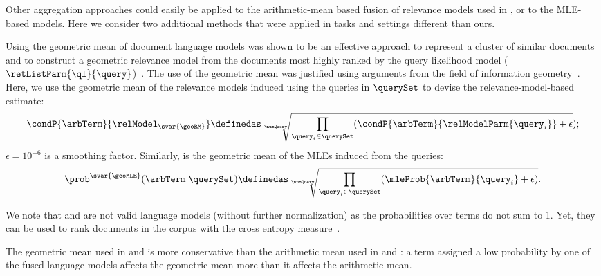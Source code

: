 Other aggregation approaches could easily be applied to the
arithmetic-mean based fusion of relevance models used in \method{\ariRM}, or
to the MLE-based models.
Here we consider two additional methods that were applied in tasks
and settings different than ours.

 Using the geometric mean of document
language models was shown to be an effective approach to represent a
cluster of similar documents~\cite{Liu+Croft:08a} and to
construct a geometric relevance model from the documents
most highly ranked by the query likelihood model
($\retListParm{\ql}{\query}$)~\cite{Seo+Croft:10a}.
The use of the geometric mean was justified using arguments from the
field of information geometry~\cite{Seo+Croft:10a}.
Here, we use the geometric mean of the relevance models induced using
the queries in $\querySet$ to devise the \firstmention{\geoRM}
relevance-model-based estimate:
\begin{equation}
\label{eq:geo}
\condP{\arbTerm}{\relModel_{\svar{\geoRM}}} \definedas \sqrt[\numQuery]{ \prod_{\query_i \in \querySet} (\condP{\arbTerm} {\relModelParm{\query_i} }+ \epsilon}); 
\end{equation}
$\epsilon = 10^{-6}$ is a smoothing factor.
Similarly, \firstmention{\geoMLE} is the geometric mean of the MLEs
induced from the queries:
\begin{equation}
\label{eq:geoMLE}
\prob^{\svar{\geoMLE}}(\arbTerm|\querySet) \definedas \sqrt[\numQuery]{ \prod_{\query_i \in \querySet} (\mleProb{\arbTerm} {\query_i} + \epsilon)}.
\end{equation}

We note that \method{\geoRM} and \method{\geoMLE} are not valid language models
(without further normalization) as the probabilities over terms do
not sum to 1.
Yet, they can be used to rank documents in the corpus with the cross
entropy measure~\cite{Liu+Croft:08a,Seo+Croft:10a}.

The geometric mean used in \method{\geoRM} and \method{\geoMLE} is more conservative
than the arithmetic mean used in \method{\ariRM} and \method{\ariMLE}: a term assigned
a low probability by one of the fused language models affects the
geometric mean
more than it affects the arithmetic mean.


